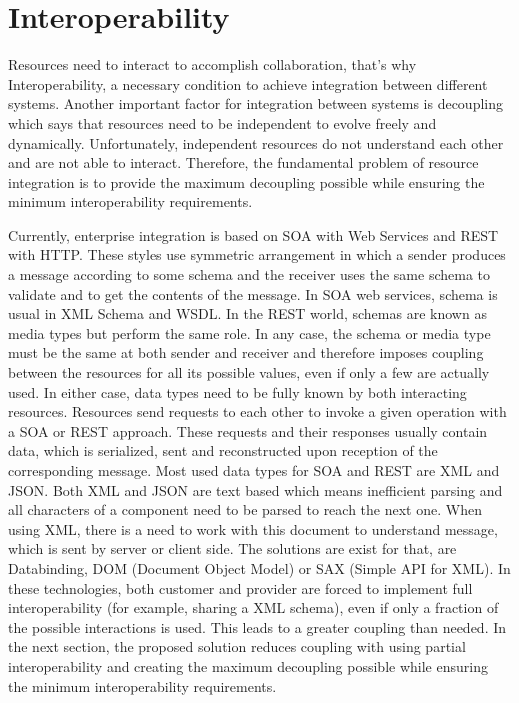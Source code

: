\documentclass[runningheads,a4paper]{llncs}
\begin{document}
\section{Interoperability}
Resources need to interact to accomplish collaboration, that’s why Interoperability, a necessary condition to achieve integration between different systems. Another important factor for integration between systems is decoupling which says that resources need to be independent to evolve freely and dynamically. Unfortunately, independent resources do not understand each other and are not able to interact. Therefore, the fundamental problem of resource integration is to provide the maximum decoupling possible while ensuring the minimum interoperability requirements.

Currently, enterprise integration is based on SOA with Web Services and REST with HTTP.  These styles use symmetric arrangement in which a sender produces a message according to some schema and the receiver uses the same schema to validate and to get the contents of the message. In SOA web services, schema is usual in XML Schema and WSDL. In the REST world, schemas are known as media types but perform the same role. In any case, the schema or media type must be the same at both sender and receiver and therefore imposes coupling between the resources for all its possible values, even if only a few are actually used. In either case, data types need to be fully known by both interacting resources. Resources send requests to each other to invoke a given operation with a SOA or REST approach. These requests and their responses usually contain data, which is serialized, sent and reconstructed upon reception of the corresponding message. Most used data types for SOA and REST are XML and JSON. Both XML and JSON are text based which means inefficient parsing and all characters of a component need to be parsed to reach the next one. When using XML, there is a need to work with this document to understand message, which is sent by server or client side. The solutions are exist for that, are Databinding, DOM (Document Object Model) or SAX (Simple API for XML)\cite{arch20}. In these technologies, both customer and provider are forced to implement full interoperability (for example, sharing a XML schema), even if only a fraction of the possible interactions is used. This leads to a greater coupling than needed. In the next section, the proposed solution reduces coupling with using partial interoperability and creating the maximum decoupling possible while ensuring the minimum interoperability requirements.
\end{document}
